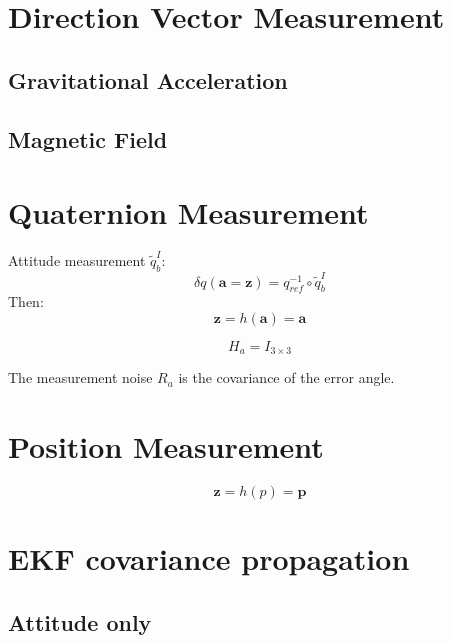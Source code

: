 \documentclass[a4paper]{paper}
\begin{document}
\section{Direction Vector Measurement}

\subsection{Gravitational Acceleration}

\subsection{Magnetic Field}

\section{Quaternion Measurement}

Attitude measurement $\tilde{q}_b^I$:
\begin{equation}
    \delta q(\bm{a}=\bm{z}) = q_{ref}^{-1} \circ \tilde{q}_b^I
    \label{eq:q_measurement_def}
\end{equation}
Then:
\begin{equation}
    \bm{z} = h(\bm{a}) = \bm{a}
    \label{eq:q_measurement_fn}
\end{equation}

\begin{equation}
    H_a = I_{3\times3}
    \label{eq:q_measurement_H}
\end{equation}

The measurement noise $R_a$ is the covariance of the error angle.

\section{Position Measurement}

\begin{equation}
    \bm{z} = h(p) = \bm{p}
    \label{eq:pos_measurement_fn}
\end{equation}


\section{EKF covariance propagation}

\subsection{Attitude only}
\end{document}
